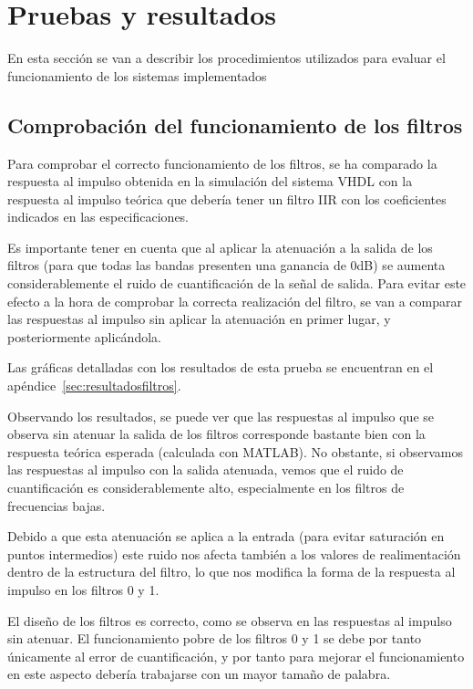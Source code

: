 \documentclass[a4paper,12pt]{article}
\begin{document}
\clearpage
\section{Pruebas y resultados}
En esta sección se van a describir los procedimientos utilizados para evaluar el funcionamiento de los sistemas implementados
\subsection{Comprobación del funcionamiento de los filtros}\label{sec:pruebafiltros}
Para comprobar el correcto funcionamiento de los filtros, se ha comparado la respuesta al impulso obtenida en la simulación del sistema VHDL con la respuesta al impulso teórica que debería tener un filtro IIR con los coeficientes indicados en las especificaciones.

Es importante tener en cuenta que al aplicar la atenuación a la salida de los filtros (para que todas las bandas presenten una ganancia de 0dB) se aumenta considerablemente el ruido de cuantificación de la señal de salida. Para evitar este efecto a la hora de comprobar la correcta realización del filtro, se van a comparar las respuestas al impulso sin aplicar la atenuación en primer lugar, y posteriormente aplicándola.

Las gráficas detalladas con los resultados de esta prueba se encuentran en el apéndice~\ref{sec:resultadosfiltros}.

Observando los resultados, se puede ver que las respuestas al impulso que se observa sin atenuar la salida de los filtros corresponde bastante bien con la respuesta teórica esperada (calculada con MATLAB). No obstante, si observamos las respuestas al impulso con la salida atenuada, vemos que el ruido de cuantificación es considerablemente alto, especialmente en los filtros de frecuencias bajas.

Debido a que esta atenuación se aplica a la entrada (para evitar saturación en puntos intermedios) este ruido nos afecta también a los valores de realimentación dentro de la estructura del filtro, lo que nos modifica la forma de la respuesta al impulso en los filtros 0 y 1.

El diseño de los filtros es correcto, como se observa en las respuestas al impulso sin atenuar. El funcionamiento pobre de los filtros 0 y 1 se debe por tanto únicamente al error de cuantificación, y por tanto para mejorar el funcionamiento en este aspecto debería trabajarse con un mayor tamaño de palabra.
\end{document}
